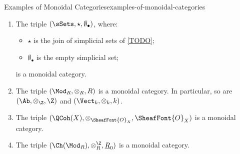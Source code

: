 \begin{example}{Examples of Monoidal Categories}{examples-of-monoidal-categories}
\begin{enumerate}
\begin{itemize}
            \end{itemize}
            is a monoidal category.
        \item\label{examples-of-monoidal-categories-simplicial-sets}The triple $(\sSets,\star,\emptyset_{\bullet})$, where:
            \begin{itemize}
                \item $\star$ is the join of simplicial sets of \cref{TODO};
                \item $\emptyset_{\bullet}$ is the empty simplicial set;
            \end{itemize}
            is a monoidal category.
        \item\label{examples-of-monoidal-categories-r-modules}The triple $(\Mod_{R},\otimes_{R},R)$ is a monoidal category. In particular, so are $(\Ab,\otimes_{\Z},\Z)$ and $(\Vect_{k},\otimes_{k},k)$.
        \item\label{examples-of-monoidal-categories-quasicoherent-sheaves}The triple $(\QCoh(X),\otimes_{\SheafFont{O}_{X}},\SheafFont{O}_{X})$ is a monoidal category.
        \item\label{examples-of-monoidal-categories-chain-complexes}The triple $(\Ch(\Mod_{R}),\otimes^{\Z}_{R},\underline{R}_{0})$ is a monoidal category.
    \end{enumerate}
\end{example}
